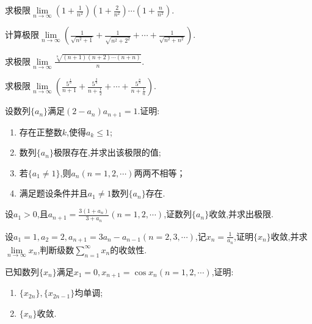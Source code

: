 \documentclass[UTF8,a4paper]{ctexart}
\begin{document}
\pagestyle{NoHeader}%
\songti%
\setlength{\parindent}{2em}%
\begin{example}[太原理工大学,2023]
	求极限$\lim\limits_{n\to\infty}\left(1+\frac{1}{n^2}\right)\left(1+\frac{2}{n^2}\right)\dotsm\left(1+\frac{n}{n^2}\right)$.
	\end{example}
\begin{example}[北京科技大学,2023]
	计算极限$\lim\limits_{n\to\infty}\left(\frac{1}{\sqrt{n^2+1}}+\frac{1}{\sqrt{n^2+2^2}}+\dotsb+\frac{1}{\sqrt{n^2+n^2}}\right)$.
\end{example}
\newpage
\begin{thinking}[西北大学,2023]
	求极限$\lim\limits_{n\to\infty}\frac{\sqrt[n]{(n+1)(n+2)\dotsm(n+n)}}{n}$.
\end{thinking}
\begin{thinking}[南京大学,2023]
	求极限$\lim\limits_{n\to\infty}\left(\frac{5^{\frac{1}{n}}}{n+1}+\frac{5^{\frac{2}{n}}}{n+\frac{1}{2}}+\cdots+\frac{5^{\frac{n}{n}}}{n+\frac{1}{n}}\right)$.
\end{thinking}
\newpage
\begin{example}[华东师范大学,2023]
	设数列$\{a_n\}$满足$(2-a_n)a_{n+1}=1$.证明:
	\begin{enumerate}
		\item 存在正整数$k$,使得$a_k\leq1$;
		\item 数列$\{a_n\}$极限存在,并求出该极限的值;
		\item 若$\{a_1\ne1\}$,则$a_n(n=1,2,\cdots)$两两不相等；
		\item 满足题设条件并且$a_1\neq1$数列${\{a_n\}}$存在.
	\end{enumerate}
\end{example}
\newpage
\begin{thinking}[福州大学,2023]
设$a_1>0$,且$a_{n+1}=\frac{3(1+a_n)}{3+a_n}(n=1,2,\cdots)$,证数列$\{a_n\}$收敛,并求出极限.
\end{thinking}
\begin{thinking}[南京航空航天大学,2023]
	设$a_1=1,a_2=2,a_{n+1}=3a_n-a_{n-1}(n=2,3,\cdots)$,记$x_n=\frac{1}{a_n}$,证明$\{x_n\}$收敛,并求$\lim\limits_{n\to\infty}x_n$,判断级数$\sum\limits_{n=1}^{\infty}x_n$的收敛性.
\end{thinking}
\newpage
\begin{example}[西安交通大学,2023]
	已知数列$\{x_n\}$满足$x_1=0,x_{n+1}=\cos x_n(n=1,2,\cdots)$,证明:
	\begin{enumerate}
	\item $\{x_{2n}\},\{x_{2n-1}\}$均单调;
	\item $\{x_n\}$收敛.
		\end{enumerate}
	\end{example}
\end{document}
